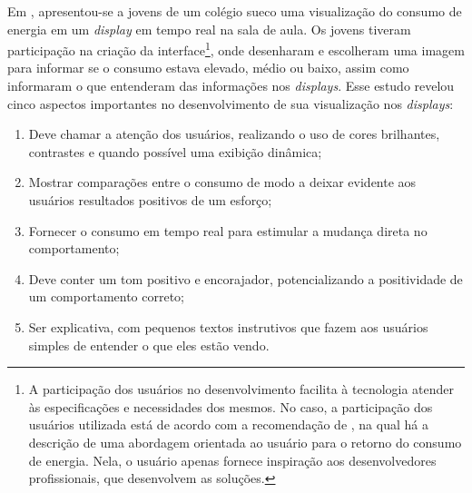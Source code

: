 Em \cite{2012_visualisation_sweden}, apresentou-se a jovens de um
colégio sueco uma visualização do consumo de energia em um
\emph{display} em tempo real na sala de aula. Os jovens tiveram
participação na criação da interface\footnote{A participação dos
usuários no desenvolvimento facilita à tecnologia atender às
especificações e necessidades dos mesmos. No caso, a participação dos
usuários utilizada está de acordo com a recomendação de
\cite{2009_extreme_user_filandia}, na qual há a descrição de uma
abordagem orientada ao usuário para o retorno do consumo de energia.
Nela, o usuário apenas fornece inspiração aos desenvolvedores
profissionais, que desenvolvem as soluções.}, onde desenharam e
escolheram uma imagem para informar se o consumo estava elevado, médio
ou baixo, assim como informaram o que entenderam das informações nos
\emph{displays}.  Esse estudo revelou cinco aspectos importantes no
desenvolvimento de sua visualização nos \emph{displays}:

\begin{enumerate}
\item Deve chamar a atenção dos usuários, realizando o uso de cores brilhantes,
contrastes e quando possível uma exibição dinâmica; 
\item Mostrar comparações entre o consumo de modo a deixar evidente aos usuários
resultados positivos de um esforço;
\item Fornecer o consumo em tempo real para estimular a mudança direta no
comportamento;
\item Deve conter um tom positivo e encorajador, potencializando a positividade
de um comportamento correto;
\item Ser explicativa, com pequenos textos instrutivos que fazem aos usuários
simples de entender o que eles estão vendo.
\end{enumerate}

